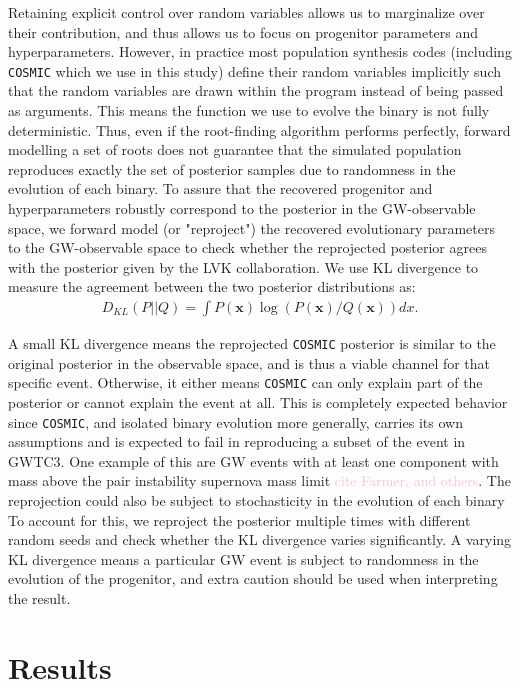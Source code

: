 \documentclass[twocolumn]{aastex631}
\newcommand{\kb}[1]{\textcolor{pink}{#1}}
\begin{document}
Retaining explicit control over random variables allows us to marginalize over their contribution, 
and thus allows us to focus on progenitor parameters and hyperparameters.
However, in practice most population synthesis codes (including \texttt{COSMIC} which we use in this study) 
define their random variables implicitly such that the random variables are drawn within the program instead of 
being passed as arguments. This means the function we use to evolve the binary is not fully deterministic.
Thus, even if the root-finding algorithm performs perfectly, forward modelling a set of roots does not 
guarantee that the simulated population reproduces exactly the set of posterior samples due to 
randomness in the evolution of each binary. To assure that the recovered progenitor and hyperparameters 
robustly correspond to the posterior in the GW-observable space, we forward model (or "reproject") the recovered 
evolutionary parameters to the GW-observable space to check whether the reprojected posterior agrees 
with the posterior given by the LVK collaboration. We use KL divergence to measure the agreement between the two posterior 
distributions as:
\begin{align}
D_{KL}(P||Q) = \int P(\bm{x}) \log(P(\bm{x})/Q(\bm{x})) dx.
\label{eq:KLdivergence}
\end{align}


A small KL divergence means the reprojected \texttt{COSMIC} posterior is similar to the original posterior in the 
observable space, and is thus a viable channel for that specific event. Otherwise, it either means \texttt{COSMIC} 
can only explain part of the posterior or cannot explain the event at all. This is completely expected behavior since 
\texttt{COSMIC}, and isolated binary evolution more generally, carries its own assumptions and is expected to 
fail in reproducing a subset of the event in GWTC3. One example of this are GW events with at least one component 
with mass above the pair instability supernova mass limit \kb{cite Farmer, and others}.
The reprojection could also be subject to stochasticity in the evolution of each binary
To account for this, we reproject the posterior multiple times with different random seeds and 
check whether the KL divergence varies significantly. A varying KL divergence means a particular GW event is subject 
to randomness in the evolution of the progenitor, and extra caution should be used when interpreting the result.


\section{Results}
\label{sec:result}
    
\end{document}

